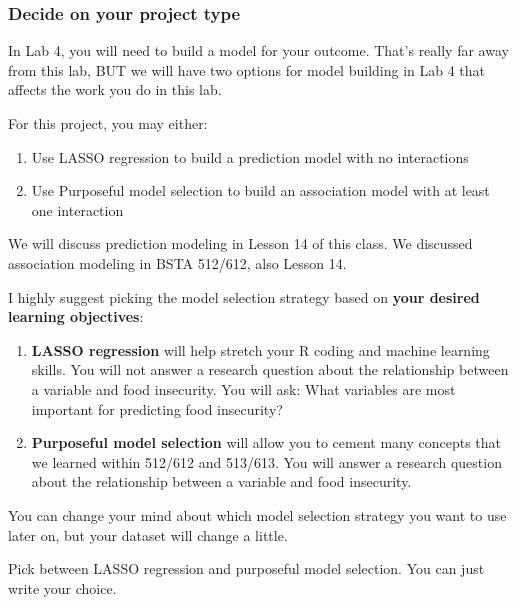 \documentclass[
  letterpaper,
  DIV=11,
  numbers=noendperiod]{scrartcl}
\providecommand{\tightlist}{%
  \setlength{\itemsep}{0pt}\setlength{\parskip}{0pt}}
\begin{document}
\subsubsection{Decide on your project
type}\label{decide-on-your-project-type}

In Lab 4, you will need to build a model for your outcome. That's really
far away from this lab, BUT we will have two options for model building
in Lab 4 that affects the work you do in this lab.

For this project, you may either:

\begin{enumerate}
\def\labelenumi{\arabic{enumi}.}
\tightlist
\item
  Use LASSO regression to build a prediction model with no interactions
\item
  Use Purposeful model selection to build an association model with at
  least one interaction
\end{enumerate}

We will discuss prediction modeling in Lesson 14 of this class. We
discussed association modeling in BSTA 512/612, also Lesson 14.

I highly suggest picking the model selection strategy based on
\textbf{your desired learning objectives}:

\begin{enumerate}
\def\labelenumi{\arabic{enumi}.}
\tightlist
\item
  \textbf{LASSO regression} will help stretch your R coding and machine
  learning skills. You will not answer a research question about the
  relationship between a variable and food insecurity. You will ask:
  What variables are most important for predicting food insecurity?
\item
  \textbf{Purposeful model selection} will allow you to cement many
  concepts that we learned within 512/612 and 513/613. You will answer a
  research question about the relationship between a variable and food
  insecurity.
\end{enumerate}

You can change your mind about which model selection strategy you want
to use later on, but your dataset will change a little.

\begin{tcolorbox}[enhanced jigsaw, toptitle=1mm, toprule=.15mm, leftrule=.75mm, bottomtitle=1mm, breakable, opacityback=0, titlerule=0mm, title=\textcolor{quarto-callout-important-color}{\faExclamation}\hspace{0.5em}{Task}, arc=.35mm, colback=white, rightrule=.15mm, left=2mm, colbacktitle=quarto-callout-important-color!10!white, coltitle=black, opacitybacktitle=0.6, colframe=quarto-callout-important-color-frame, bottomrule=.15mm]

Pick between LASSO regression and purposeful model selection. You can
just write your choice.

\end{tcolorbox}
\end{document}
